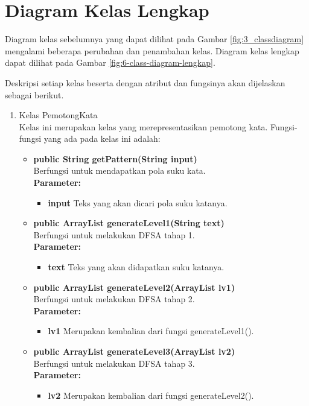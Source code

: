 \section{Diagram Kelas Lengkap}

Diagram kelas sebelumnya yang dapat dilihat pada Gambar \ref{fig:3_classdiagram} mengalami beberapa perubahan dan penambahan kelas. Diagram kelas lengkap dapat dilihat pada Gambar \ref{fig:6-class-diagram-lengkap}.

Deskripsi setiap kelas beserta dengan atribut dan fungsinya akan dijelaskan sebagai berikut.

\begin{enumerate}
	\item Kelas PemotongKata\\
	Kelas ini merupakan kelas yang merepresentasikan pemotong kata. Fungsi-fungsi yang ada pada kelas ini adalah:
	\begin{itemize}
		\item \textbf{public String getPattern(String input)}\\
		Berfungsi untuk mendapatkan pola suku kata.\\
		\textbf{Parameter:}
		\begin{itemize}
			\item \textbf{input} Teks yang akan dicari pola suku katanya.
		\end{itemize}
		
		\item \textbf{public ArrayList generateLevel1(String text)}\\
		Berfungsi untuk melakukan DFSA tahap 1.\\
		\textbf{Parameter:}
		\begin{itemize}
			\item \textbf{text} Teks yang akan didapatkan suku katanya.
		\end{itemize}
		
		\item \textbf{public ArrayList generateLevel2(ArrayList lv1)}\\
		Berfungsi untuk melakukan DFSA tahap 2.\\
		\textbf{Parameter:}
		\begin{itemize}
			\item \textbf{lv1} Merupakan kembalian dari fungsi generateLevel1().
		\end{itemize}
		
		\item \textbf{public ArrayList generateLevel3(ArrayList lv2)}\\
		Berfungsi untuk melakukan DFSA tahap 3.\\
		\textbf{Parameter:}
		\begin{itemize}
			\item \textbf{lv2} Merupakan kembalian dari fungsi generateLevel2().
		\end{itemize}
		

\end{itemize}
\end{enumerate}
